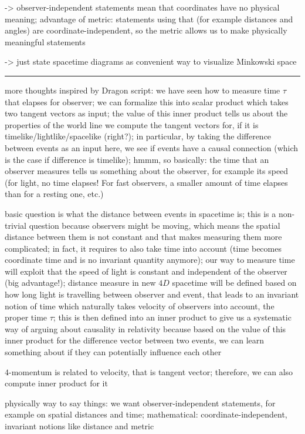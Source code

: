 -> observer-independent statements mean that coordinates have no physical meaning; advantage of metric: statements using that (for example distances and angles) are coordinate-independent, so the metric allows us to make physically meaningful statements

-> just state spacetime diagrams as convenient way to visualize Minkowski space

\hrule

more thoughts inspired by Dragon script: we have seen how to measure time $\tau$ that elapses for observer; we can formalize this into scalar product which takes two tangent vectors as input; the value of this inner product tells us about the properties of the world line we compute the tangent vectors for, if it is timelike/lightlike/spacelike (right?); in particular, by taking the difference between events as an input here, we see if events have a causal connection (which is the case if difference is timelike); hmmm, so basically: the time that an observer measures tells us something about the observer, for example its speed (for light, no time elapses! For fast observers, a smaller amount of time elapses than for a resting one, etc.)

basic question is what the distance between events in spacetime is; this is a non-trivial question because observers might be moving, which means the spatial distance between them is not constant and that makes measuring them more complicated; in fact, it requires to also take time into account (time becomes coordinate time and is no invariant quantity anymore); our way to measure time will exploit that the speed of light is constant and independent of the observer (big advantage!); distance measure in new $4D$ spacetime will be defined based on how long light is travelling between observer and event, that leads to an invariant notion of time which naturally takes velocity of observers into account, the proper time $\tau$; this is then defined into an inner product to give us a systematic way of arguing about causality in relativity because based on the value of this inner product for the difference vector between two events, we can learn something about if they can potentially influence each other


$4$-momentum is related to velocity, that is tangent vector; therefore, we can also compute inner product for it


physically way to say things: we want observer-independent statements, for example on spatial distances and time; mathematical: coordinate-independent, invariant notions like distance and metric


